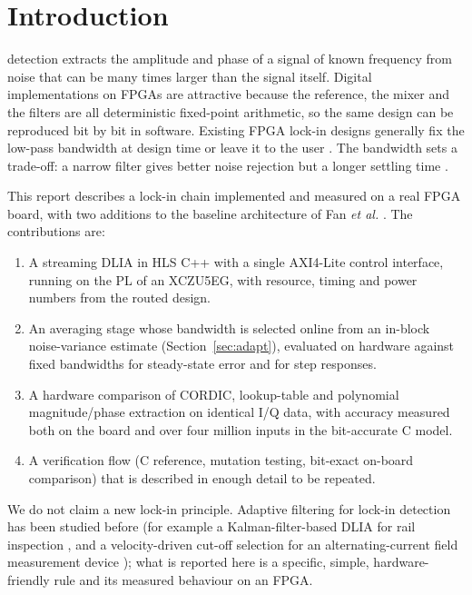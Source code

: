 \documentclass[journal]{IEEEtran}
\begin{document}
\section{Introduction}
 detection extracts the amplitude and phase of a signal of known frequency from noise that can be many times larger than the signal itself. Digital implementations on FPGAs are attractive because the reference, the mixer and the filters are all deterministic fixed-point arithmetic, so the same design can be reproduced bit by bit in software. Existing FPGA lock-in designs generally fix the low-pass bandwidth at design time or leave it to the user \cite{fan,zhang,yao,olia}. The bandwidth sets a trade-off: a narrow filter gives better noise rejection but a longer settling time \cite{olia}.

This report describes a lock-in chain implemented and measured on a real FPGA board, with two additions to the baseline architecture of Fan \emph{et al.} \cite{fan}. The contributions are:
\begin{enumerate}
\item A streaming DLIA in HLS C++ with a single AXI4-Lite control interface, running on the PL of an XCZU5EG, with resource, timing and power numbers from the routed design.
\item An averaging stage whose bandwidth is selected online from an in-block noise-variance estimate (Section~\ref{sec:adapt}), evaluated on hardware against fixed bandwidths for steady-state error and for step responses.
\item A hardware comparison of CORDIC, lookup-table and polynomial magnitude/phase extraction on identical I/Q data, with accuracy measured both on the board and over four million inputs in the bit-accurate C model.
\item A verification flow (C reference, mutation testing, bit-exact on-board comparison) that is described in enough detail to be repeated.
\end{enumerate}
We do not claim a new lock-in principle. Adaptive filtering for lock-in detection has been studied before (for example a Kalman-filter-based DLIA for rail inspection \cite{chen}, and a velocity-driven cut-off selection for an alternating-current field measurement device \cite{acfm}); what is reported here is a specific, simple, hardware-friendly rule and its measured behaviour on an FPGA.
\end{document}
